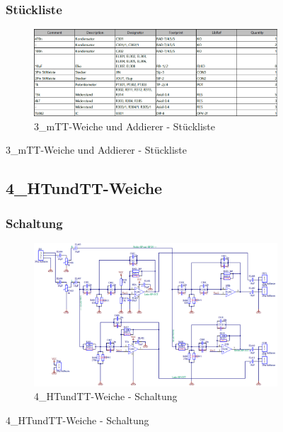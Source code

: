 \begin{figure}
	\subsubsection*{Stückliste}
	\begin{figure} [H]
		\centering
		\includegraphics[width=1\textwidth]{img/Print3/3mTTWeicheruAddierer-Blist.png}
		\caption{3\_mTT-Weiche und Addierer - Stückliste}
		\label {fig:8.10.12}
	\end{figure}
\end{figure}






\begin{figure}
	\subsection{4\_HTundTT-Weiche}
	\subsubsection*{Schaltung}
	\begin{figure} [H]
		\centering
		\includegraphics[width=1\textwidth]{img/Print4/4_TTuHTWeiche-Schematic.png}
		\caption{4\_HTundTT-Weiche - Schaltung}
		\label {fig:8.10.13}
	\end{figure}
\end{figure}

